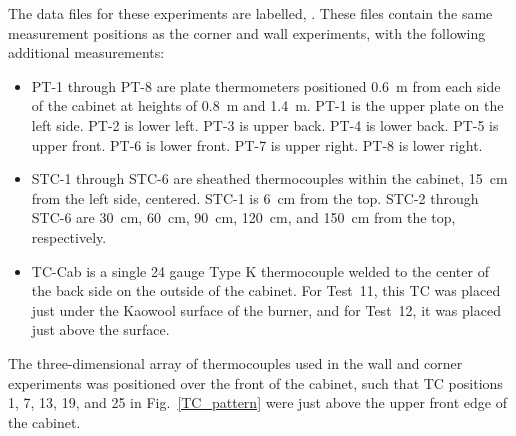The data files for these experiments are labelled, . These files contain the same measurement positions as the corner and wall experiments, with the following additional measurements:
\begin{itemize}
\item PT-1 through PT-8 are plate thermometers positioned 0.6~m from each side of the cabinet at heights of 0.8~m and 1.4~m. PT-1 is the upper plate on the left side. PT-2 is lower left. PT-3 is upper back. PT-4 is lower back. PT-5 is upper front. PT-6 is lower front. PT-7 is upper right. PT-8 is lower right.
\item STC-1 through STC-6 are sheathed thermocouples within the cabinet, 15~cm from the left side, centered. STC-1 is 6~cm from the top. STC-2 through STC-6 are 30~cm, 60~cm, 90~cm, 120~cm, and 150~cm from the top, respectively.
\item TC-Cab is a single 24 gauge Type K thermocouple welded to the center of the back side on the outside of the cabinet. For Test~11, this TC was placed just under the Kaowool surface of the burner, and for Test~12, it was placed just above the surface.
\end{itemize}
The three-dimensional array of thermocouples used in the wall and corner experiments was positioned over the front of the cabinet, such that TC positions 1, 7, 13, 19, and 25 in Fig.~\ref{TC_pattern} were just above the upper front edge of the cabinet.

